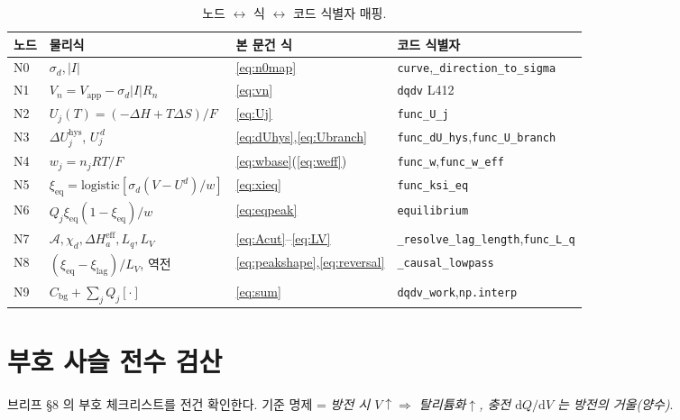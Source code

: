 \documentclass[11pt,a4paper]{article}
\newcommand{\dd}{\mathrm{d}}
\newcommand{\eff}{\mathrm{eff}}
\newcommand{\eq}{\mathrm{eq}}
\newcommand{\app}{\mathrm{app}}
\newcommand{\bg}{\mathrm{bg}}
\newcommand{\hys}{\mathrm{hys}}
\newcommand{\code}[1]{\texttt{#1}}
\begin{document}
\begin{table}[t]
\centering
\renewcommand{\arraystretch}{1.3}
\caption{노드 $\leftrightarrow$ 식 $\leftrightarrow$ 코드 식별자 매핑.}
\label{tab:nodemap}
\begin{tabular}{l l l l}
\toprule
노드 & 물리식 & 본 문건 식 & 코드 식별자 \\
\midrule
N0 & $\sigma_d,|I|$ & \eqref{eq:n0map} & \code{curve},\code{\_direction\_to\_sigma} \\
N1 & $V_n=V_\app-\sigma_d|I|R_n$ & \eqref{eq:vn} & \code{dqdv} L412 \\
N2 & $U_j(T)=(-\Delta H+T\Delta S)/F$ & \eqref{eq:Uj} & \code{func\_U\_j} \\
N3 & $\Delta U_j^\hys$, $U_j^{\,d}$ & \eqref{eq:dUhys},\eqref{eq:Ubranch} & \code{func\_dU\_hys},\code{func\_U\_branch} \\
N4 & $w_j=n_jRT/F$ & \eqref{eq:wbase}(\eqref{eq:weff}) & \code{func\_w},\code{func\_w\_eff} \\
N5 & $\xi_\eq=\mathrm{logistic}[\sigma_d(V-U^d)/w]$ & \eqref{eq:xieq} & \code{func\_ksi\_eq} \\
N6 & $Q_j\xi_\eq(1-\xi_\eq)/w$ & \eqref{eq:eqpeak} & \code{equilibrium} \\
N7 & $\mathcal A,\chi_d,\Delta H_a^\eff,L_q,L_V$ & \eqref{eq:Acut}--\eqref{eq:LV} & \code{\_resolve\_lag\_length},\code{func\_L\_q} \\
N8 & $(\xi_\eq-\xi_\mathrm{lag})/L_V$, 역전 & \eqref{eq:peakshape},\eqref{eq:reversal} & \code{\_causal\_lowpass} \\
N9 & $C_\bg+\sum_jQ_j[\cdot]$ & \eqref{eq:sum} & \code{dqdv\_work},\code{np.interp} \\
\bottomrule
\end{tabular}
\end{table}

\section{부호 사슬 전수 검산}\label{sec:signcheck}
브리프 §8 의 부호 체크리스트를 전건 확인한다. 기준 명제 = \emph{방전 시
$V\!\uparrow\Rightarrow$ 탈리튬화$\uparrow$, 충전 $\dd Q/\dd V$ 는 방전의 거울(양수)}.
\end{document}
